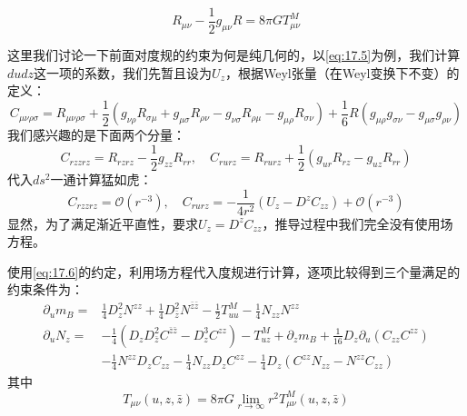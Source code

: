 \begin{equation}
	R_{\mu\nu}-\frac{1}{2}g_{\mu\nu}R=8\pi G T^M_{\mu\nu}
\end{equation}
\begin{remark}
	这里我们讨论一下前面对度规的约束为何是纯几何的，以\ref{eq:17.5}为例，我们计算$dudz$这一项的系数，我们先暂且设为$U_z$，根据Weyl张量（在Weyl变换下不变）的定义：
	\begin{equation}
		C_{\mu\nu\rho\sigma}=R_{\mu\nu\rho\sigma}+\frac{1}{2}\left(g_{\nu\rho}R_{\sigma\mu}+g_{\mu\sigma}R_{\rho\nu}-g_{\nu\sigma}R_{\rho\mu}-g_{\mu\rho}R_{\sigma\nu}\right)+\frac{1}{6}R\left(g_{\mu\rho}g_{\sigma\nu}-g_{\mu\sigma}g_{\rho\nu}\right)
	\end{equation}
	我们感兴趣的是下面两个分量：
	\begin{equation}
		C_{rzzrz}=R_{rzrz}-\frac{1}{2}g_{zz}R_{rr},\quad C_{rurz}=R_{rurz}+\frac{1}{2}(g_{ur}R_{rz}-g_{uz}R_{rr})
	\end{equation}
	代入$ds^2$一通计算猛如虎：
	\begin{equation}
		C_{rzzrz}=\mathcal{O}(r^{-3}),\quad C_{rurz}=-\frac{1}{4r^2}\left(U_z-D^z C_{zz}\right)+\mathcal{O}(r^{-3})
	\end{equation}
	显然，为了满足渐近平直性，要求$U_z=D^zC_{zz}$，推导过程中我们完全没有使用场方程。
\end{remark}
使用\ref{eq:17.6}的约定，利用场方程代入度规进行计算，逐项比较得到三个量满足的约束条件为：
\begin{equation}
	\begin{aligned}
		\partial_u m_B=&\frac{1}{4}D_z^2N^{zz}+\frac{1}{4}D_{\bar z}^2N^{\bar z\bar z}-\frac{1}{2}T^M_{uu}-\frac{1}{4}N_{zz}N^{zz}\\
		\partial_u N_z=&-\frac{1}{4}\left(D_zD_{\bar z}^2C^{\bar z\bar z}-D^3_zC^{zz}\right)-T^{M}_{uz}+\partial_z m_B+\frac{1}{16}D_z\partial_u(C_{zz}C^{zz})\\
		&-\frac{1}{4}N^{zz}D_zC_{zz}-\frac{1}{4}N_{zz}D_zC^{zz}-\frac{1}{4}D_z\left(C^{zz}N_{zz}-N^{zz}C_{zz}\right)
	\end{aligned}
\end{equation}
其中
\begin{equation}
	T_{\mu\nu}(u,z,\bar z)=8\pi G\lim_{r\to\infty}r^2 T^M_{\mu\nu}(u,z,\bar z)
\end{equation}

